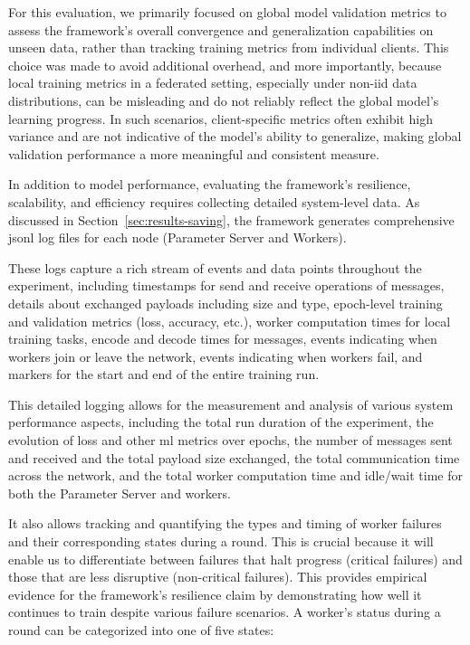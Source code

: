 For this evaluation, we primarily focused on global model validation metrics to assess the framework's overall convergence and generalization capabilities on unseen data, rather than tracking training metrics from individual clients. This choice was made to avoid additional overhead, and more importantly, because local training metrics in a federated setting, especially under \ac{non-iid} data distributions, can be misleading and do not reliably reflect the global model's learning progress. In such scenarios, client-specific metrics often exhibit high variance and are not indicative of the model's ability to generalize, making global validation performance a more meaningful and consistent measure.

In addition to model performance, evaluating the framework's resilience, scalability, and efficiency requires collecting detailed system-level data. As discussed in Section~\ref{sec:results-saving}, the framework generates comprehensive \ac{jsonl} log files for each node (Parameter Server and Workers). 

These logs capture a rich stream of events and data points throughout the experiment, including timestamps for send and receive operations of messages, details about exchanged payloads including size and type, epoch-level training and validation metrics (loss, accuracy, etc.), worker computation times for local training tasks, encode and decode times for messages, events indicating when workers join or leave the network, events indicating when workers fail, and markers for the start and end of the entire training run.

This detailed logging allows for the measurement and analysis of various system performance aspects, including the total run duration of the experiment, the evolution of loss and other \ac{ml} metrics over epochs, the number of messages sent and received and the total payload size exchanged, the total communication time across the network, and the total worker computation time and idle/wait time for both the Parameter Server and workers.

It also allows tracking and quantifying the types and timing of worker failures and their corresponding states during a round. This is crucial because it will enable us to differentiate between failures that halt progress (critical failures) and those that are less disruptive (non-critical failures). This provides empirical evidence for the framework's resilience claim by demonstrating how well it continues to train despite various failure scenarios. A worker's status during a round can be categorized into one of five states:

